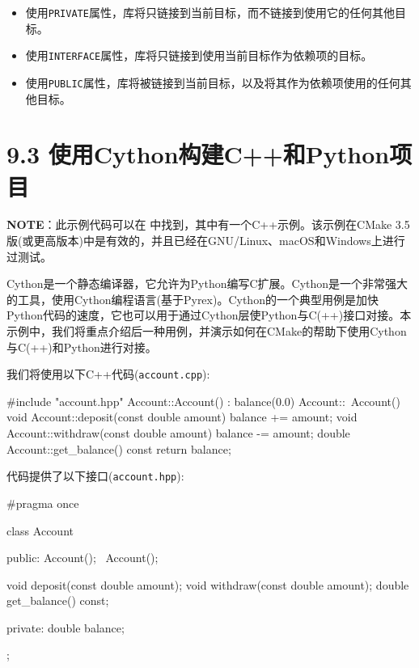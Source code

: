\begin{itemize}
\item 使用\texttt{PRIVATE}属性，库将只链接到当前目标，而不链接到使用它的任何其他目标。

\item 使用\texttt{INTERFACE}属性，库将只链接到使用当前目标作为依赖项的目标。

\item 使用\texttt{PUBLIC}属性，库将被链接到当前目标，以及将其作为依赖项使用的任何其他目标。

\end{itemize}


\section{9.3 使用Cython构建C++和Python项目}

\begin{myInfoBox}
\textbf{NOTE}：此示例代码可以在  中找到，其中有一个C++示例。该示例在CMake 3.5版(或更高版本)中是有效的，并且已经在GNU/Linux、macOS和Windows上进行过测试。
\end{myInfoBox}

Cython是一个静态编译器，它允许为Python编写C扩展。Cython是一个非常强大的工具，使用Cython编程语言(基于Pyrex)。Cython的一个典型用例是加快Python代码的速度，它也可以用于通过Cython层使Python与C(++)接口对接。本示例中，我们将重点介绍后一种用例，并演示如何在CMake的帮助下使用Cython与C(++)和Python进行对接。


我们将使用以下C++代码(\texttt{account.cpp}):

\begin{codebox}[cpp]
#include "account.hpp"
Account::Account() : balance(0.0) {}
Account::~Account() {}
void Account::deposit(const double amount) { balance += amount; }
void Account::withdraw(const double amount) { balance -= amount; }
double Account::get_balance() const { return balance; }
\end{codebox}

代码提供了以下接口(\texttt{account.hpp}):

\begin{codebox}[cpp]
#pragma once

class Account {
public:
  Account();
  ~Account();
  
  void deposit(const double amount);
  void withdraw(const double amount);
  double get_balance() const;
  
private:
    double balance;
};
\end{codebox}

